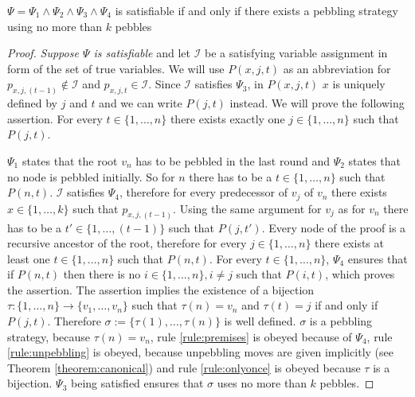 \begin{theorem}

$\Psi = \Psi_1 \wedge \Psi_2 \wedge \Psi_3 \wedge \Psi_4$ is satisfiable if and only if there exists a pebbling strategy using no more than $k$ pebbles

\end{theorem}

\begin{proof}

\emph{Suppose $\Psi$ is satisfiable} and let $\mathcal{I}$ be a satisfying variable assignment in form of the set of true variables.
We will use $P(x,j,t)$ as an abbreviation for $p_{x,j,(t-1)} \notin \mathcal{I}$ and $p_{x,j,t} \in \mathcal{I}$.
Since $\mathcal{I}$ satisfies $\Psi_3$, in $P(x,j,t)$ $x$ is uniquely defined by $j$ and $t$ and we can write $P(j,t)$ instead.
We will prove the following assertion.
For every $t \in \{1,\ldots,n\}$ there exists exactly one $j \in \{1,\ldots,n\}$ such that $P(j,t)$.

$\Psi_1$ states that the root $v_n$ has to be pebbled in the last round and $\Psi_2$ states that no node is pebbled initially.
So for $n$ there has to be a $t \in \{1,\ldots,n\}$ such that $P(n,t)$.
$\mathcal{I}$ satisfies $\Psi_4$, therefore for every predecessor of $v_j$ of $v_n$ there exists $x \in \{1,\ldots,k\}$ such that $p_{x,j,(t-1)}$.
Using the same argument for $v_j$ as for $v_n$ there has to be a $t' \in \{1,\ldots,(t-1)\}$ such that $P(j,t')$.
Every node of the proof is a recursive ancestor of the root, therefore for every $j \in \{1,\ldots,n\}$ there exists at least one $t \in \{1,\ldots,n\}$ such that $P(n,t)$.
For every $t \in \{1,\ldots,n\}$, $\Psi_4$ ensures that if $P(n,t)$ then there is no $i \in \{1,\ldots,n\}, i \neq j$ such that $P(i,t)$, which proves the assertion.
The assertion implies the existence of a bijection $\tau : \{1,\ldots,n\} \rightarrow \{v_1,\ldots,v_n\}$ such that $\tau(n) = v_n$ and $\tau(t) = j$ if and only if $P(j,t)$.
Therefore $\sigma := \{\tau(1),\ldots,\tau(n)\}$ is well defined.
$\sigma$ is a pebbling strategy, because $\tau(n) = v_n$, rule \ref{rule:premises} is obeyed because of $\Psi_4$, rule \ref{rule:unpebbling} is obeyed, because unpebbling moves are given implicitly (see Theorem \ref{theorem:canonical}) and rule \ref{rule:onlyonce} is obeyed because $\tau$ is a bijection.
$\Psi_3$ being satisfied ensures that $\sigma$ uses no more than $k$ pebbles.


\end{proof}
